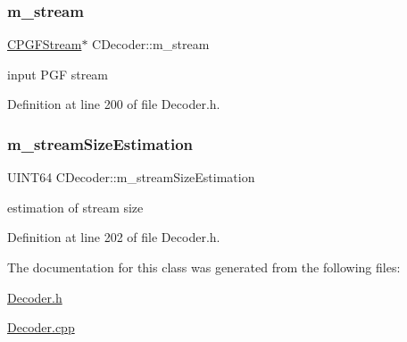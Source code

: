 \mbox{\label{classCDecoder_a4a083ad657a4f6236603c3090b44b2c5}} 
\subsubsection{\texorpdfstring{m\_stream}{m\_stream}}
{\footnotesize\ttfamily \mbox{\hyperlink{classCPGFStream}{C\+P\+G\+F\+Stream}}$\ast$ C\+Decoder\+::m\+\_\+stream\hspace{0.3cm}{\ttfamily [private]}}



input P\+GF stream 



Definition at line 200 of file Decoder.\+h.

\mbox{\label{classCDecoder_a6562d817189d48cfed14b5e8b921e180}} 
\subsubsection{\texorpdfstring{m\_streamSizeEstimation}{m\_streamSizeEstimation}}
{\footnotesize\ttfamily U\+I\+N\+T64 C\+Decoder\+::m\+\_\+stream\+Size\+Estimation\hspace{0.3cm}{\ttfamily [private]}}



estimation of stream size 



Definition at line 202 of file Decoder.\+h.



The documentation for this class was generated from the following files\+:\begin{DoxyCompactItemize}
\item 
\mbox{\hyperlink{Decoder_8h}{Decoder.\+h}}\item 
\mbox{\hyperlink{Decoder_8cpp}{Decoder.\+cpp}}\end{DoxyCompactItemize}
